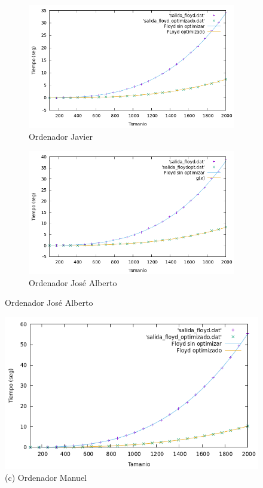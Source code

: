 \documentclass[10pt,a4paper]{article}
\begin{document}
\begin{figure}[h!]
\begin{subfigure}{.4\textwidth}
	\includegraphics[scale=0.3]{../../Images/floyd_opt_Javi5454.png}
	\caption{Ordenador Javier}
	\label{Floyd Optimizado Javi5454}
\end{subfigure}
\hfill
\begin{subfigure}{.4\textwidth}
	\includegraphics[scale=0.3]{../../Images/floyd_opt_Jota.png}
	\caption{Ordenador José Alberto}
	\label{Floyd Optimizado Jota}
\end{subfigure}
\end{figure}

\begin{figure}[h!]
\centering
\includegraphics[scale=0.28]{../../Images/floyd_opt_ManuelMoya.png}
\caption*{(c) Ordenador Manuel}
\end{figure}
\end{document}
